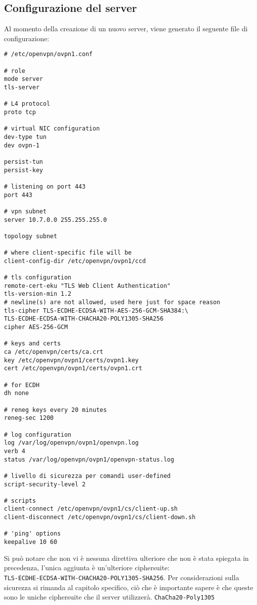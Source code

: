 \subsection{Configurazione del server}
Al momento della creazione di un nuovo server, viene generato il seguente file
di configurazione:
\begin{verbatim}
# /etc/openvpn/ovpn1.conf

# role
mode server
tls-server

# L4 protocol
proto tcp

# virtual NIC configuration
dev-type tun
dev ovpn-1

persist-tun
persist-key

# listening on port 443
port 443

# vpn subnet
server 10.7.0.0 255.255.255.0

topology subnet

# where client-specific file will be
client-config-dir /etc/openvpn/ovpn1/ccd

# tls configuration
remote-cert-eku "TLS Web Client Authentication"
tls-version-min 1.2
# newline(s) are not allowed, used here just for space reason
tls-cipher TLS-ECDHE-ECDSA-WITH-AES-256-GCM-SHA384:\
TLS-ECDHE-ECDSA-WITH-CHACHA20-POLY1305-SHA256
cipher AES-256-GCM

# keys and certs
ca /etc/openvpn/certs/ca.crt
key /etc/openvpn/ovpn1/certs/ovpn1.key
cert /etc/openvpn/ovpn1/certs/ovpn1.crt

# for ECDH
dh none

# reneg keys every 20 minutes
reneg-sec 1200

# log configuration
log /var/log/openvpn/ovpn1/openvpn.log
verb 4
status /var/log/openvpn/ovpn1/openvpn-status.log

# livello di sicurezza per comandi user-defined
script-security-level 2

# scripts
client-connect /etc/openvpn/ovpn1/cs/client-up.sh
client-disconnect /etc/openvpn/ovpn1/cs/client-down.sh

# 'ping' options
keepalive 10 60
\end{verbatim}
Si può notare che non vi è nessuna direttiva ulteriore che non è stata spiegata in
precedenza, l'unica aggiunta è un'ulteriore ciphersuite:\\
\texttt{TLS-ECDHE-ECDSA-WITH-CHACHA20-POLY1305-SHA256}. Per considerazioni sulla
sicurezza si rimanda al capitolo specifico, ciò che è importante sapere è che
queste sono le uniche ciphersuite che il server utilizzerà. \texttt{ChaCha20-Poly1305}
